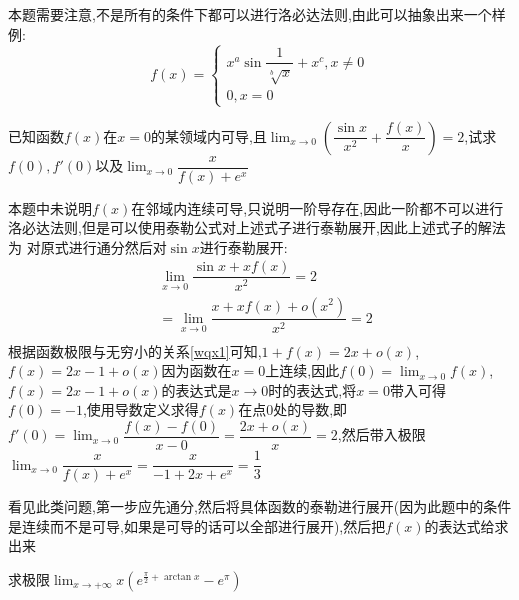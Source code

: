 \documentclass[12pt, a4paper, oneside, UTF8]{ctexbook}
\begin{document}
\begin{sloppypar}
\begin{solution}
    \end{solution}
    \begin{note}
        本题需要注意,不是所有的条件下都可以进行洛必达法则,由此可以抽象出来一个样例:
        $$f\left(x\right)=\begin{cases}x^a\sin\dfrac{1}{\sqrt[b]{x}}+x^c,x\neq0\\0,x=0\end{cases}$$
    \end{note}
    \begin{problem}
        已知函数$f(x)$在$x=0$的某领域内可导,且$\lim_{x \to 0}(\dfrac{\sin x}{x^2}+\dfrac{f(x)}{x})=2$,试求$f(0),f'(0)$以及$\lim_{x\to0}\dfrac{x}{f(x)+e^x}$
    \end{problem}
    \begin{solution}
        本题中未说明$f(x)$在邻域内连续可导,只说明一阶导存在,因此一阶都不可以进行洛必达法则,但是可以使用泰勒公式对上述式子进行泰勒展开,因此上述式子的解法为
        对原式进行通分然后对$\sin x$进行泰勒展开:
        \begin{equation*}
            \begin{split}    
                & \lim_{x \to 0}\dfrac{\sin x+xf(x)}{x^2}=2\\
                & = \lim_{x \to 0}\dfrac{x+xf(x)+o(x^2)}{x^2}=2 \\
            \end{split}
        \end{equation*} 
    根据函数极限与无穷小的关系\ref{wqx1}可知,$1+f(x)=2x+o(x)$,$f(x)=2x-1+o(x)$因为函数在$x=0$上连续,因此$f(0)=\lim_{x\to 0}f(x)$,$f(x)=2x-1+o(x)$的表达式是$x\to 0$时的表达式,将$x=0$带入可得$f(0)=-1$,使用导数定义求得$f(x)$在点0处的导数,即$f'(0)=\lim_{x \to 0}\dfrac{f(x)-f(0)}{x-0}=\dfrac{2x+o(x)}{x}=2$,然后带入极限$\lim_{x\to 0}\dfrac{x}{f(x)+e^x}=\dfrac{x}{-1+2x+e^x}=\dfrac{1}{3}$
    \end{solution}
    \begin{note}
        看见此类问题,第一步应先通分,然后将具体函数的泰勒进行展开(因为此题中的条件是连续而不是可导,如果是可导的话可以全部进行展开),然后把$f(x)$的表达式给求出来
    \end{note}
    \begin{problem}
        求极限$\lim_{x\to +\infty}x(e^{\frac{\pi}{2}+\arctan x}-e^\pi)$
    \end{problem}
    \begin{solution}

\end{solution}
\end{sloppypar}
\end{document}
